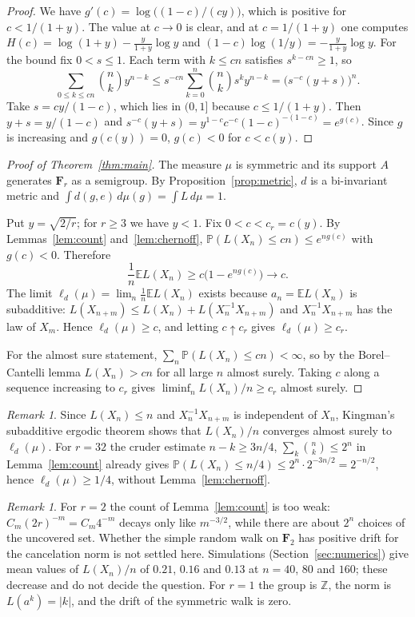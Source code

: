 \documentclass[11pt]{amsart}
\theoremstyle{definition}
\theoremstyle{remark}
\newtheorem{remark}[theorem]{Remark}
\numberwithin{equation}{section}
\newcommand{\Pp}{\mathbb P}
\newcommand{\E}{\mathbb E}
\newcommand{\F}{\mathbf F}
\begin{document}
\begin{proof}
We have $g'(c)=\log\bigl((1-c)/(cy)\bigr)$, which is positive for $c<1/(1+y)$. The value at $c\to0$ is clear, and at $c=1/(1+y)$ one computes $H(c)=\log(1+y)-\frac{y}{1+y}\log y$ and $(1-c)\log(1/y)=-\frac{y}{1+y}\log y$. For the bound fix $0<s\le1$. Each term with $k\le cn$ satisfies $s^{k-cn}\ge1$, so
\[
\sum_{0\le k\le cn}\binom nk y^{n-k}\le s^{-cn}\sum_{k=0}^n\binom nk s^ky^{n-k}=\bigl(s^{-c}(y+s)\bigr)^n .
\]
Take $s=cy/(1-c)$, which lies in $(0,1]$ because $c\le1/(1+y)$. Then $y+s=y/(1-c)$ and $s^{-c}(y+s)=y^{1-c}c^{-c}(1-c)^{-(1-c)}=e^{g(c)}$. Since $g$ is increasing and $g(c(y))=0$, $g(c)<0$ for $c<c(y)$.
\end{proof}

\begin{proof}[Proof of Theorem~\ref{thm:main}]
The measure $\mu$ is symmetric and its support $A$ generates $\F_r$ as a semigroup. By Proposition~\ref{prop:metric}, $d$ is a bi-invariant metric and $\int d(g,e)\,d\mu(g)=\int L\,d\mu=1$.

Put $y=\sqrt{2/r}$; for $r\ge3$ we have $y<1$. Fix $0<c<c_r=c(y)$. By Lemmas~\ref{lem:count} and~\ref{lem:chernoff}, $\Pp(L(X_n)\le cn)\le e^{ng(c)}$ with $g(c)<0$. Therefore
\[
\frac1n\E L(X_n)\ge c\bigl(1-e^{ng(c)}\bigr)\to c .
\]
The limit $\ell_d(\mu)=\lim_n\frac1n\E L(X_n)$ exists because $a_n=\E L(X_n)$ is subadditive: $L(X_{n+m})\le L(X_n)+L(X_n^{-1}X_{n+m})$ and $X_n^{-1}X_{n+m}$ has the law of $X_m$. Hence $\ell_d(\mu)\ge c$, and letting $c\uparrow c_r$ gives $\ell_d(\mu)\ge c_r$.

For the almost sure statement, $\sum_n\Pp(L(X_n)\le cn)<\infty$, so by the Borel--Cantelli lemma $L(X_n)>cn$ for all large $n$ almost surely. Taking $c$ along a sequence increasing to $c_r$ gives $\liminf_nL(X_n)/n\ge c_r$ almost surely.
\end{proof}

\begin{remark}
Since $L(X_n)\le n$ and $X_n^{-1}X_{n+m}$ is independent of $X_n$, Kingman's subadditive ergodic theorem shows that $L(X_n)/n$ converges almost surely to $\ell_d(\mu)$. For $r=32$ the cruder estimate $n-k\ge3n/4$, $\sum_k\binom nk\le2^n$ in Lemma~\ref{lem:count} already gives $\Pp(L(X_n)\le n/4)\le2^n\cdot2^{-3n/2}=2^{-n/2}$, hence $\ell_d(\mu)\ge1/4$, without Lemma~\ref{lem:chernoff}.
\end{remark}

\begin{remark}\label{rem:r2}
For $r=2$ the count of Lemma~\ref{lem:count} is too weak: $C_m(2r)^{-m}=C_m4^{-m}$ decays only like $m^{-3/2}$, while there are about $2^n$ choices of the uncovered set. Whether the simple random walk on $\F_2$ has positive drift for the cancelation norm is not settled here. Simulations (Section~\ref{sec:numerics}) give mean values of $L(X_n)/n$ of $0.21$, $0.16$ and $0.13$ at $n=40$, $80$ and $160$; these decrease and do not decide the question. For $r=1$ the group is $\mathbb Z$, the norm is $L(a^k)=|k|$, and the drift of the symmetric walk is zero.
\end{remark}
\end{document}
